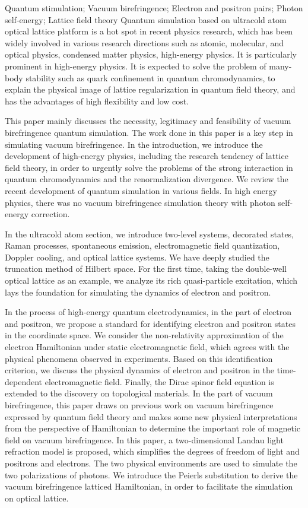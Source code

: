 \documentclass[supercite]{HustGraduPaper}
\begin{document}
	\begin{enabstract}{Quantum stimulation; Vacuum birefringence; Electron and positron pairs; Photon self-energy; Lattice field theory}
		Quantum simulation based on ultracold atom optical lattice platform is a hot spot in recent physics research, which has been widely involved in various research directions such as atomic, molecular, and optical physics, condensed matter physics, high-energy physics. It is particularly prominent in high-energy physics. It is expected to solve the problem of many-body stability such as quark confinement in quantum chromodynamics, to explain the physical image of lattice regularization in quantum field theory, and has the advantages of high flexibility and low cost.

		This paper mainly discusses the necessity, legitimacy and feasibility of vacuum birefringence quantum simulation. The work done in this paper is a key step in simulating vacuum birefringence. In the introduction, we introduce the development of high-energy physics, including the research tendency of lattice field theory, in order to urgently solve the problems of the strong interaction in quantum chromodynamics and the renormalization divergence. We review the recent development of quantum simulation in various fields. In high energy physics, there was no vacuum birefringence simulation theory with photon self-energy correction.

		In the ultracold atom section, we introduce two-level systems, decorated states, Raman processes, spontaneous emission, electromagnetic field quantization, Doppler cooling, and optical lattice systems. We have deeply studied the truncation method of Hilbert space. For the first time, taking the double-well optical lattice as an example, we analyze its rich quasi-particle excitation, which lays the foundation for simulating the dynamics of electron and positron.

		In the process of high-energy quantum electrodynamics, in the part of electron and positron, we propose a standard for identifying electron and positron states in the coordinate space. We consider the non-relativity approximation of the electron Hamiltonian under static electromagnetic field, which agrees with the physical phenomena observed in experiments. Based on this identification criterion, we discuss the physical dynamics of electron and positron in the time-dependent electromagnetic field. Finally, the Dirac spinor field equation is extended to the discovery on topological materials. In the part of vacuum birefringence, this paper draws on previous work on vacuum birefringence expressed by quantum field theory and makes some new physical interpretations from the perspective of Hamiltonian to determine the important role of magnetic field on vacuum birefringence. In this paper, a two-dimensional Landau light refraction model is proposed, which simplifies the degrees of freedom of light and positrons and electrons. The two physical environments are used to simulate the two polarizations of photons. We introduce the Peierls substitution to derive the vacuum birefringence latticed Hamiltonian, in order to facilitate the simulation on optical lattice.
		

\end{enabstract}
\end{document}
